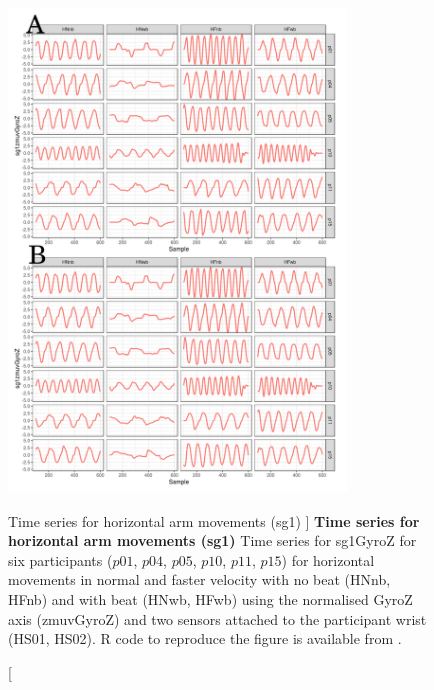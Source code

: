 \begin{figure}
\centering
\includegraphics[width=0.8\textwidth]{tssg1gyroZ}
    	\caption
	[Time series for horizontal arm movements (sg1) ]{
	{\bf Time series for horizontal arm movements (sg1)}
		Time series for sg1GyroZ for six participants 
		($p01$, $p04$, $p05$, $p10$, $p11$, $p15$) 
		for horizontal movements in normal and faster velocity with
		no beat	(HNnb, HFnb) and with beat (HNwb, HFwb) using 
		the normalised GyroZ axis (zmuvGyroZ) and 
		two sensors attached to the participant wrist (HS01, HS02).
	R code to reproduce the figure is available from \cite{hwum2018}.
        }
    \label{fig:tssg1gyroZ-hii}
\end{figure}


